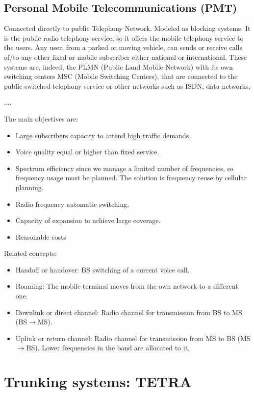 \documentclass[
	12pt,
	twoside
]{book}
\begin{document}
\subsection{Personal Mobile Telecommunications (PMT)}

Connected directly to public Telephony Network. Modeled as blocking systems. It is the public radio-telephony service, so it offers the mobile telephony service to the users. Any user, from a parked or moving vehicle, can sends or receive calls of/to any other fixed or mobile subscriber either national or international. These systems are, indeed, the PLMN (Public Land Mobile Network) with its own switching centers MSC (Mobile Switching Centers), that are connected to the public switched telephony service or other networks such as ISDN, data networks,

....

The main objectives are:
\begin{itemize}
	\item Large subscribers capacity to attend high traffic demands.
	\item Voice quality equal or higher than fixed service.
	\item Spectrum efficiency since we manage a limited number of frequencies, so frequency usage must be planned. The solution is frequency reuse by cellular planning.
	\item Radio frequency automatic switching.
	\item Capacity of expansion to achieve large coverage.
	\item Reasonable costs
\end{itemize}

Related concepts:
\begin{itemize}
	\item Handoff or handover: BS switching of a current voice call.
	\item Roaming: The mobile terminal moves from the own network to a different one.
	\item Downlink or direct channel: Radio channel for transmission from BS to MS (BS$\rightarrow$MS).
	\item Uplink or return channel: Radio channel for transmission from MS to BS (MS$\rightarrow$BS). Lower frequencies in the band are allocated to it.
\end{itemize}

\section{Trunking systems: TETRA}
\end{document}
